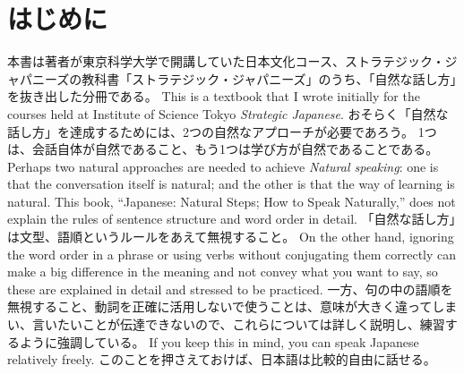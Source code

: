 \documentclass[uplatex,dvipdfmx,b5paper,english,10pt]{jsbook}
\newif\ifPREFACE
\begin{document}
\frontmatter
\thispagestyle{empty}

%


\ifEnglish
\setlength{\parindent}{3em}
\else
\fi

\ifPREFACE
\ifEnglish
\chapter*{Preface}
\else
\chapter*{はじめに}
\fi

\ifJapanese
本書は著者が東京科学大学で開講していた日本文化コース、ストラテジック・ジャパニーズの教科書「ストラテジック・ジャパニーズ」のうち、「自然な話し方」を抜き出した分冊である。
\else
This is a textbook that I wrote initially for the courses held at Institute of Science Tokyo {\itshape Strategic Japanese\/}.
\fi
\ifJapanese
おそらく「自然な話し方」を達成するためには、2つの自然なアプローチが必要であろう。
1つは、会話自体が自然であること、もう1つは学び方が自然であることである。
\else
Perhaps two natural approaches are needed to achieve {\it Natural speaking\/}:
one is that the conversation itself is natural; and the other is that the way of learning is natural.
\fi
\ifEnglish
This book, ``Japanese: Natural Steps; How to Speak Naturally,'' does not explain the rules of sentence structure and word order in detail.
\else
「自然な話し方」は文型、語順というルールをあえて無視すること。
\fi
\ifEnglish
On the other hand, ignoring the word order in a phrase or using verbs without conjugating them correctly can make a big difference in the meaning and not convey what you want to say, so these are explained in detail and stressed to be practiced.
\else
一方、句の中の語順を無視すること、動詞を正確に活用しないで使うことは、意味が大きく違ってしまい、言いたいことが伝達できないので、これらについては詳しく説明し、練習するように強調している。
\fi
\ifEnglish
If you keep this in mind, you can speak Japanese relatively freely.
\else
このことを押さえておけば、日本語は比較的自由に話せる。
\fi
\end{document}
